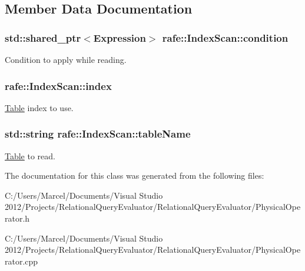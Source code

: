 \subsection{Member Data Documentation}
\hypertarget{classrafe_1_1_index_scan_a3ea0ae237e08c4a601529929f6d80052}{
\subsubsection[{condition}]{\setlength{\rightskip}{0pt plus 5cm}std\+::shared\+\_\+ptr$<${\bf Expression}$>$ rafe\+::\+Index\+Scan\+::condition}}\label{classrafe_1_1_index_scan_a3ea0ae237e08c4a601529929f6d80052}
Condition to apply while reading. \hypertarget{classrafe_1_1_index_scan_a95bd35c11302e772572cb37df93cc3a7}{
\subsubsection[{index}]{ rafe\+::\+Index\+Scan\+::index}}\label{classrafe_1_1_index_scan_a95bd35c11302e772572cb37df93cc3a7}
\hyperlink{classrafe_1_1_table}{Table} index to use. \hypertarget{classrafe_1_1_index_scan_a10d1f881994a96dee8e9e29f367626e9}{
\subsubsection[{table\+Name}]{\setlength{\rightskip}{0pt plus 5cm}std\+::string rafe\+::\+Index\+Scan\+::table\+Name}}\label{classrafe_1_1_index_scan_a10d1f881994a96dee8e9e29f367626e9}
\hyperlink{classrafe_1_1_table}{Table} to read. 

The documentation for this class was generated from the following files\+:\begin{DoxyCompactItemize}
\item 
C\+:/\+Users/\+Marcel/\+Documents/\+Visual Studio 2012/\+Projects/\+Relational\+Query\+Evaluator/\+Relational\+Query\+Evaluator/Physical\+Operator.\+h\item 
C\+:/\+Users/\+Marcel/\+Documents/\+Visual Studio 2012/\+Projects/\+Relational\+Query\+Evaluator/\+Relational\+Query\+Evaluator/Physical\+Operator.\+cpp\end{DoxyCompactItemize}
